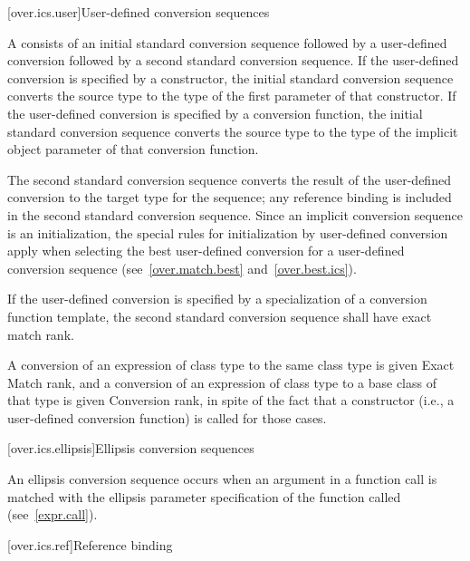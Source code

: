 [over.ics.user]{User-defined conversion sequences}

\pnum
A  consists of an initial
standard conversion sequence followed by a user-defined
conversion followed by a second standard
conversion sequence.
If the user-defined conversion is specified
by a constructor, the initial standard
conversion sequence converts the source type to the type of the
first parameter of that constructor.
If the user-defined
conversion is specified by a conversion function, the
initial standard conversion sequence
converts the source type to the type of the
implicit object parameter of that conversion function.

\pnum
The second standard conversion sequence converts the result of
the user-defined conversion to the target type for the sequence;
any reference binding is included in the second standard
conversion sequence.
Since an implicit conversion sequence is an initialization, the
special rules for initialization by user-defined conversion apply
when selecting the best user-defined conversion for a
user-defined conversion sequence (see~\ref{over.match.best} and~\ref{over.best.ics}).

\pnum
If the user-defined conversion is specified by a
specialization of a conversion function template,
the second standard conversion sequence shall have exact match rank.

\pnum
A conversion of an expression of class type
to the same class type is given Exact Match rank, and
a conversion of an expression of class type
to a base class of that type is given Conversion rank,
in spite of the
fact that a constructor (i.e., a user-defined conversion
function) is called for those cases.

[over.ics.ellipsis]{Ellipsis conversion sequences}

\pnum
{}%
An ellipsis conversion sequence occurs when an argument in a
function call is matched with the ellipsis parameter
specification of the function called (see~\ref{expr.call}).

[over.ics.ref]{Reference binding}

